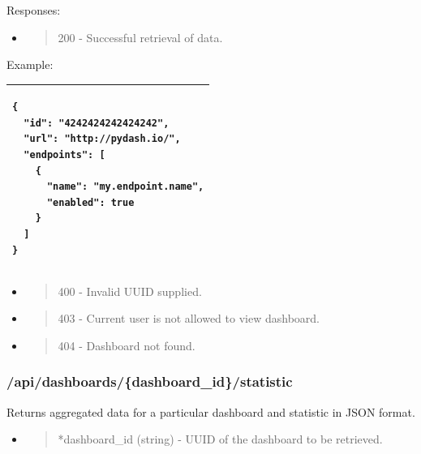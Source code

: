 Responses:

\begin{itemize}
\item
  \begin{quote}
  200 - Successful retrieval of data.
  \end{quote}
\end{itemize}

Example:

\begin{longtable}[]{@{}l@{}}
\toprule
\endhead
\begin{minipage}[t]{0.97\columnwidth}\raggedright
\begin{lstlisting}
{
  "id": "4242424242424242",
  "url": "http://pydash.io/",
  "endpoints": [
    {
      "name": "my.endpoint.name",
      "enabled": true
    }
  ]
}
\end{lstlisting}\strut
\end{minipage}\tabularnewline
\bottomrule
\end{longtable}

\begin{itemize}
\item
  \begin{quote}
  400 - Invalid UUID supplied.
  \end{quote}
\item
  \begin{quote}
  403 - Current user is not allowed to view dashboard.
  \end{quote}
\item
  \begin{quote}
  404 - Dashboard not found.
  \end{quote}
\end{itemize}

\hypertarget{apidashboardsdashboard_idstatistic}{%
\subsubsection{/api/dashboards/\{dashboard\_id\}/statistic}\label{apidashboardsdashboard_idstatistic}}

Returns aggregated data for a particular dashboard and statistic in JSON
format.

\begin{itemize}
\item
  \begin{quote}
  *dashboard\_id (string) - UUID of the dashboard to be retrieved.
  \end{quote}
\end{itemize}


